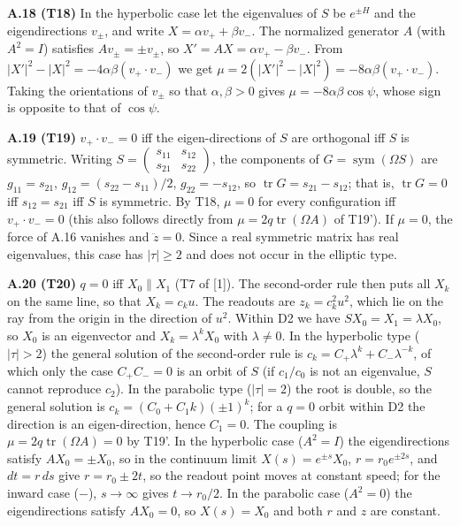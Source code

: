 \documentclass[
  a4paper,
]{article}
\begin{document}
\textbf{A.18 (T18)} In the hyperbolic case let the eigenvalues of \(S\)
be \(e^{\pm H}\) and the eigendirections \(v_\pm\), and write
\(X=\alpha v_++\beta v_-\). The normalized generator \(A\) (with
\(A^2=I\)) satisfies \(Av_\pm=\pm v_\pm\), so
\(X'=AX=\alpha v_+-\beta v_-\). From
\(\lvert X'\rvert^2-\lvert X\rvert^2=-4\alpha\beta(v_+\!\cdot v_-)\) we
get
\(\mu=2(\lvert X'\rvert^2-\lvert X\rvert^2)=-8\alpha\beta(v_+\!\cdot v_-)\).
Taking the orientations of \(v_\pm\) so that \(\alpha,\beta>0\) gives
\(\mu=-8\alpha\beta\cos\psi\), whose sign is opposite to that of
\(\cos\psi\).

\textbf{A.19 (T19)} \(v_+\!\cdot v_-=0\) iff the eigen-directions of
\(S\) are orthogonal iff \(S\) is symmetric. Writing
\(S=\begin{pmatrix}s_{11}&s_{12}\\s_{21}&s_{22}\end{pmatrix}\), the
components of \(G=\operatorname{sym}(\Omega S)\) are \(g_{11}=s_{21}\),
\(g_{12}=(s_{22}-s_{11})/2\), \(g_{22}=-s_{12}\), so
\(\operatorname{tr}G=s_{21}-s_{12}\); that is, \(\operatorname{tr}G=0\)
iff \(s_{12}=s_{21}\) iff \(S\) is symmetric. By T18, \(\mu=0\) for
every configuration iff \(v_+\!\cdot v_-=0\) (this also follows directly
from \(\mu=2q\operatorname{tr}(\Omega A)\) of T19'). If \(\mu=0\), the
force of A.16 vanishes and \(\ddot z=0\). Since a real symmetric matrix
has real eigenvalues, this case has \(\lvert\tau\rvert\ge2\) and does
not occur in the elliptic type.

\textbf{A.20 (T20)} \(q=0\) iff \(X_0\parallel X_1\) (T7 of {[}1{]}).
The second-order rule then puts all \(X_k\) on the same line, so that
\(X_k=c_ku\). The readouts are \(z_k=c_k^2u^2\), which lie on the ray
from the origin in the direction of \(u^2\). Within D2 we have
\(SX_0=X_1=\lambda X_0\), so \(X_0\) is an eigenvector and
\(X_k=\lambda^kX_0\) with \(\lambda\neq0\). In the hyperbolic type
(\(\lvert\tau\rvert>2\)) the general solution of the second-order rule
is \(c_k=C_+\lambda^k+C_-\lambda^{-k}\), of which only the case
\(C_+C_-=0\) is an orbit of \(S\) (if \(c_1/c_0\) is not an eigenvalue,
\(S\) cannot reproduce \(c_2\)). In the parabolic type
(\(\lvert\tau\rvert=2\)) the root is double, so the general solution is
\(c_k=(C_0+C_1k)(\pm1)^k\); for a \(q=0\) orbit within D2 the direction
is an eigen-direction, hence \(C_1=0\). The coupling is
\(\mu=2q\operatorname{tr}(\Omega A)=0\) by T19'. In the hyperbolic case
(\(A^2=I\)) the eigendirections satisfy \(AX_0=\pm X_0\), so in the
continuum limit \(X(s)=e^{\pm s}X_0\), \(r=r_0e^{\pm2s}\), and
\(dt=r\,ds\) give \(r=r_0\pm2t\), so the readout point moves at constant
speed; for the inward case (\(-\)), \(s\to\infty\) gives \(t\to r_0/2\).
In the parabolic case (\(A^2=0\)) the eigendirections satisfy
\(AX_0=0\), so \(X(s)=X_0\) and both \(r\) and \(z\) are constant.
\end{document}

